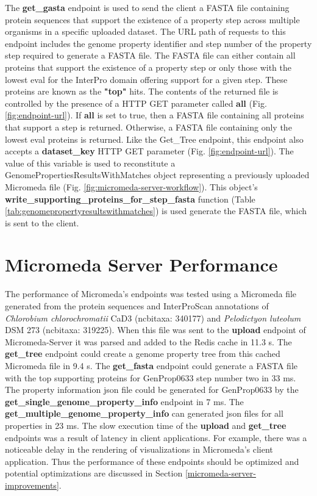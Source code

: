 The \textbf{get\_gasta} endpoint is used to send the client a FASTA file containing protein sequences that support the existence of a property step across multiple organisms in a specific uploaded dataset. The URL path of requests to this endpoint includes the genome property identifier and step number of the property step required to generate a FASTA file. The FASTA file can either contain all proteins that support the existence of a property step or only those with the lowest \gls{eval} for the InterPro domain offering support for a given step. These proteins are known as the \textbf{"top"} hits. The contents of the returned file is controlled by the presence of a HTTP GET parameter called \textbf{all} (Fig. \ref{fig:endpoint-url}). If \textbf{all} is set to true, then a FASTA file containing all proteins that support a step is returned. Otherwise, a FASTA file containing only the lowest \gls{eval} proteins is returned. Like the Get\_Tree endpoint, this endpoint also accepts a \textbf{dataset\_key} HTTP GET parameter (Fig. \ref{fig:endpoint-url}). The value of this variable is used to reconstitute a GenomePropertiesResultsWithMatches object representing a previously uploaded Micromeda file (Fig. \ref{fig:micromeda-server-workflow}). This object's \textbf{write\_supporting\_proteins\_for\_step\_fasta} function (Table \ref{tab:genomepropertyresultswithmatches}) is used generate the FASTA file, which is sent to the client.

\section{Micromeda Server Performance} \label{micromeda-server-performance}

The performance of Micromeda's endpoints was tested using a Micromeda file generated from the protein sequences and InterProScan annotations of \textit{Chlorobium chlorochromatii} CaD3 (\gls{ncbitaxa}: 340177) and \textit{Pelodictyon luteolum} DSM 273 (\gls{ncbitaxa}:  319225). When this file was sent to the \textbf{upload} endpoint of Micromeda-Server it was parsed and added to the Redis cache in 11.3  s. The \textbf{get\_tree} endpoint could create a genome property tree from this cached Micromeda file in 9.4  s. The \textbf{get\_fasta} endpoint could generate a FASTA file with the top supporting proteins for GenProp0633 step number two in 33  ms. The property information \gls{json} file could be generated for GenProp0633 by the \textbf{get\_single\_genome\_property\_info} endpoint in 7  ms. The \textbf{get\_multiple\_genome\_property\_info} can generated \gls{json} files for all properties in 23  ms. The slow execution time of the \textbf{upload} and \textbf{get\_tree} endpoints was a result of latency in client applications. For example, there was a noticeable delay in the rendering of visualizations in Micromeda's client application. Thus the performance of these endpoints should be optimized and potential optimizations are discussed in Section \ref{micromeda-server-improvements}.

